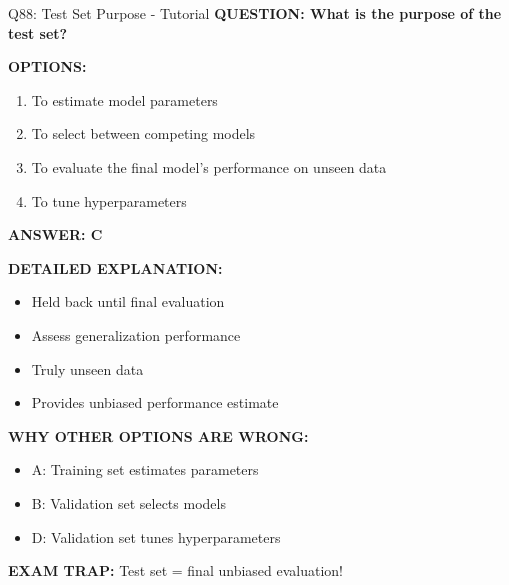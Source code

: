 \documentclass[8pt]{beamer}
\begin{document}
	\begin{frame}{Q88: Test Set Purpose - Tutorial}
		\fontsize{6.5}{7.5}\selectfont
		\textbf{QUESTION: What is the purpose of the test set?}
		
		\vspace{0.1cm}
		\textbf{OPTIONS:}
		\begin{enumerate}
			\item To estimate model parameters
			\item To select between competing models
			\item To evaluate the final model's performance on unseen data
			\item To tune hyperparameters
		\end{enumerate}
		
		\vspace{0.1cm}
		\textcolor{myblue}{\textbf{ANSWER: C}}
		
		\vspace{0.1cm}
		\textbf{DETAILED EXPLANATION:}
		\begin{itemize}
			\item Held back until final evaluation
			\item Assess generalization performance
			\item Truly unseen data
			\item Provides unbiased performance estimate
		\end{itemize}
		
		\vspace{0.1cm}
		\textcolor{myred}{\textbf{WHY OTHER OPTIONS ARE WRONG:}}
		\begin{itemize}
			\item \textcolor{myred}{A:} Training set estimates parameters
			\item \textcolor{myred}{B:} Validation set selects models
			\item \textcolor{myred}{D:} Validation set tunes hyperparameters
		\end{itemize}
		
		\textcolor{myred}{\textbf{EXAM TRAP:}} Test set = \textcolor{myblue}{final unbiased evaluation}!
	\end{frame}
	
\end{document}
